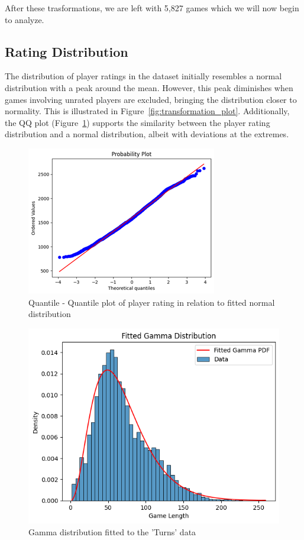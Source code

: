 \documentclass[conference]{IEEEtran}
\begin{document}
After these trasformations, we are left with 5,827 games which we will now begin to analyze.

\subsection{Rating Distribution}
The distribution of player ratings in the dataset initially resembles a normal distribution with a peak around the mean. However, this peak diminishes when games involving unrated players are excluded, bringing the distribution closer to normality. This is illustrated in Figure~\ref{fig:transformation_plot}. Additionally, the QQ plot (Figure~\ref{fig:rating_qq}) supports the similarity between the player rating distribution and a normal distribution, albeit with deviations at the extremes.

\begin{figure}[H]
    \centering
    \includegraphics[width=0.8\linewidth]{ratingqq.png}
    \caption{Quantile - Quantile plot of player rating in relation to fitted normal distribution}
    \label{fig:rating_qq}
\end{figure}

\begin{figure}[H]
    \centering
    \includegraphics[width=0.8\linewidth]{gamma_fit.png}
    \caption{Gamma distribution fitted to the 'Turns' data}
    \label{fig:gamma_fit}
\end{figure}
\end{document}
